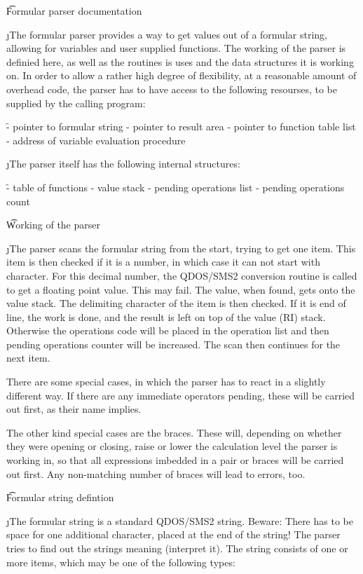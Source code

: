 \t Formular parser documentation

\j The formular parser provides a way to get values out of a
formular string, allowing for variables and user supplied functions.
The working of the parser is definied here, as well as the routines
is uses and the data structures it is working on.
In order to allow a rather high degree of flexibility, at a reasonable
amount of overhead code, the parser has to have access to the following
resourses, to be supplied by the calling program:

\f
     - pointer to formular string
     - pointer to result area
     - pointer to function table list
     - address of variable evaluation procedure

\j The parser itself has the following internal structures:

\f
     - table of functions
     - value stack
     - pending operations list
     - pending operations count



\t Working of the parser

\j The parser scans the formular string from the start, trying to
get one item. This item is then checked if it is a number, in which
case it can not start with character. For this decimal number, the
QDOS/SMS2 conversion routine is called to get a floating point value. This
may fail. The value, when found, gets onto the value stack.
The delimiting character of the item is then checked.
If it is end of line, the work is done, and the result is left on
top of the value (RI) stack. Otherwise the operations
code will be placed in the operation list and then pending operations
counter will be increased. The scan then continues for the next item.

There are some special cases, in which the parser has to react in a
slightly different way. If there are any immediate operators pending,
these will be carried out first, as their name implies.

The other kind special cases are the braces. These will, depending
on whether they were opening or closing, raise or lower the calculation
level the parser is working in, so that all expressions imbedded in
a pair or braces will be carried out first. Any non-matching number
of braces will lead to errors, too.



\t Formular string defintion

\j The formular string is a standard QDOS/SMS2 string. Beware: There
has to be space for one additional character, placed at the end of the
string! The parser tries to
find out the strings meaning (interpret it).
The string consists of one or more
items, which may be one of the following types:

